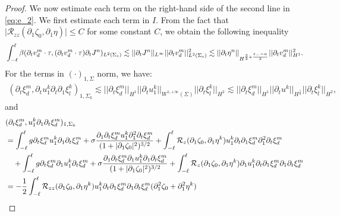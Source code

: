 \documentclass[letterpaper,reqno,10pt,twoside]{amsart}
\theoremstyle{definition}
\theoremstyle{remark}
\def\p{\partial}
\begin{document}
\begin{proof}
		We now estimate each term on the right-hand side of the second line in \eqref{eq:e_2}. We first estimate each term in $I$. From the fact that $\vert \mathcal{R}_{zz}(\partial_{1}\zeta_{0},\partial_{1}\eta)\vert\leq C$ for some constant $C$, we obtain the following inequality
		\begin{align}{\label{est:dt_u}}
			\int_{-\ell}^{\ell}\beta(\partial_{t}v_{d}^{m}\cdot \tau,(\partial_{t}v_{d}^{m} \cdot \tau)\partial_{t}J^{n})_{L^{2}(\Sigma_{s})}\lesssim \vert \vert \partial_{t}J^{n}\vert \vert_{L^{\infty}}\vert \vert \partial_{t}v_{d}^{m}\vert\vert^{2}_{L^{2}(\Sigma_{s})}\lesssim \vert \vert \partial_{t}\eta^{n}\vert \vert_{H^{\frac{3}{2}+\frac{\varepsilon_{-}-\alpha}{2}}}\vert \vert \partial_{t}v_{d}^{m}\vert \vert_{H^{1}}^{2}.
		\end{align}
		For the terms in $(\cdot)_{1,\Sigma}$ norm, we have:
		\begin{align}
			(\partial_{t}\xi_{d}^{m},\partial_{t}u_{1}^{k}\partial_{t}\partial_{1}\xi_{l}^{k})_{1,\Sigma_{k}}\lesssim \vert \vert \partial_{t}\xi_{d}^{m}\vert \vert_{H^{1}}\vert \vert \partial_{t}u_{1}^{k}\vert \vert_{W^{1,+\infty}(\Sigma)}\vert \vert \partial_{t}\xi_{l}^{k}\vert \vert_{H^{2}}\lesssim \vert \vert \partial_{t}\xi_{d}^{m}\vert \vert_{H^{1}}\vert \vert \partial_{t}u^{k}\vert \vert_{H^{\frac{5}{2}}}\vert \vert \partial_{t}\xi_{l}^{k}\vert \vert_{H^{2}}\label{eq:n1},
		\end{align}
		\noindent and
		\begin{align}
			&(\partial_{t}\xi_{d}^{m},u_{1}^{k}\partial_{1}\partial_{t}\xi_{d}^{m})_{1,\Sigma_{k}}\notag\\
			&=\int_{-\ell}^{\ell}g\partial_{t}\xi_{d}^{m}u_{1}^{k}\partial_{1}\partial_{t}\xi_{d}^{m}+\sigma\frac{\p_1\partial_{t}\xi_{d}^{m}u_{1}^{k}\partial_{1}^{2}\partial_{t}\xi_{d}^{m}}{(1+|\p_1\zeta_0|^2)^{3/2}}+\int_{-\ell}^{\ell}\mathcal{R}_{z}(\partial_{1}\zeta_{0},\partial_{1}\eta^{k})u_{1}^{k}\partial_{t}\partial_{1}\xi_{d}^{m}\partial_{1}^{2}\partial_{t}\xi_{d}^{m}\notag\\
			&\quad+\int_{-\ell}^{\ell}g\partial_{t}\xi_{d}^{m}\partial_{1}u_{1}^{k}\partial_{t}\xi_{d}^{m}+\sigma\frac{\p_1\partial_{t}\xi_{d}^{m}\partial_{1}u_{1}^{k}\partial_{1}\partial_{t}\xi_{d}^{m}}{(1+|\p_1\zeta_0|^2)^{3/2}}+\int_{-\ell}^{\ell}\mathcal{R}_{z}(\partial_{1}\zeta_{0},\partial_{1}\eta^{k})\partial_{1}u_{1}^{k}\partial_{t}\partial_{1}\xi_{d}^{m}\partial_{1}\partial_{t}\xi_{d}^{m}\notag\\
			&=-\frac{1}{2}\int_{-\ell}^{\ell}\mathcal{R}_{zz}(\partial_{1}\zeta_{0},\partial_{1}\eta^{k})u_{1}^{k}\partial_{t}\partial_{1}\xi_{d}^{m}\partial_{1}\partial_{t}\xi_{d}^{m}(\partial_{1}^{2}\zeta_{0}+\partial_{1}^{2}\eta^{k})\notag\\

\end{align}
\end{proof}
\end{document}
